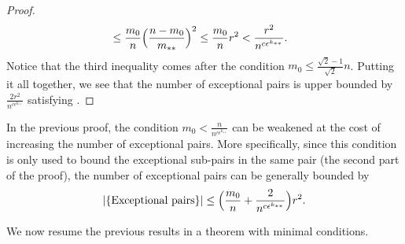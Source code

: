 \begin{lemma}
\begin{proof}
\[\begin{split}
                            & \leq \frac{m_0}{n} \Bigl( \frac{n - m_0}{m_{**}} \Bigr)^2
                                \leq \frac{m_0}{n} r^2
                                < \frac{r^2}{n^{c \epsilon^{k_{**}}}}.
                    \end{split}
                \]
                Notice that the third inequality comes after the condition $m_0 \leq \frac{\sqrt{2}-1}{\sqrt{2}} n$.
                Putting it all together, we see that the number of exceptional pairs is upper bounded by
                    $\frac{2r^2}{n^{c\epsilon^{k_{**}}}}$ satisfying .
            \end{proof}
        \end{lemma}

        \begin{remark}
            In the previous proof, the condition $m_0 < \frac{n}{n^{c\epsilon^{k_{**}}}}$ can be
            weakened at the cost of increasing the number of exceptional pairs.
            More specifically, since this condition is only used to bound the exceptional sub-pairs in the same pair
            (the second part of the proof), the number of exceptional pairs can be generally bounded by
            \[
                |\{ \text{Exceptional pairs} \}|
                    \leq \Bigl( \frac{m_0}{n} + \frac{2}{n^{c\epsilon^{k_{**}}}} \Bigr) r^2.
            \]
        \end{remark}

        We now resume the previous results in a theorem with minimal conditions.


